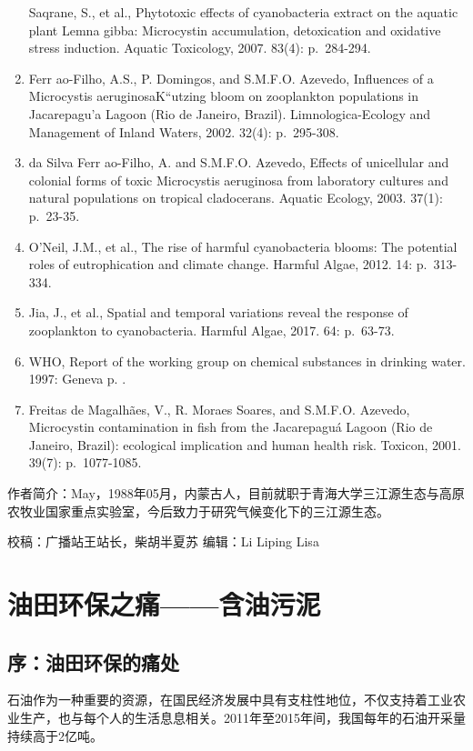 \documentclass[]{book}
\begin{document}
\begin{enumerate}
  Saqrane, S., et al., Phytotoxic effects of cyanobacteria extract on
  the aquatic plant Lemna gibba: Microcystin accumulation, detoxication
  and oxidative stress induction. Aquatic Toxicology, 2007. 83(4):
  p.~284-294.
\item
  Ferr ao-Filho, A.S., P. Domingos, and S.M.F.O. Azevedo, Influences of
  a Microcystis aeruginosaK``utzing bloom on zooplankton populations in
  Jacarepagu'a Lagoon (Rio de Janeiro, Brazil). Limnologica-Ecology and
  Management of Inland Waters, 2002. 32(4): p.~295-308.
\item
  da Silva Ferr ao-Filho, A. and S.M.F.O. Azevedo, Effects of
  unicellular and colonial forms of toxic Microcystis aeruginosa from
  laboratory cultures and natural populations on tropical cladocerans.
  Aquatic Ecology, 2003. 37(1): p.~23-35.
\item
  O'Neil, J.M., et al., The rise of harmful cyanobacteria blooms: The
  potential roles of eutrophication and climate change. Harmful Algae,
  2012. 14: p.~313-334.
\item
  Jia, J., et al., Spatial and temporal variations reveal the response
  of zooplankton to cyanobacteria. Harmful Algae, 2017. 64: p.~63-73.
\item
  WHO, Report of the working group on chemical substances in drinking
  water. 1997: Geneva p. .
\item
  Freitas de Magalhães, V., R. Moraes Soares, and S.M.F.O. Azevedo,
  Microcystin contamination in fish from the Jacarepaguá Lagoon (Rio de
  Janeiro, Brazil): ecological implication and human health risk.
  Toxicon, 2001. 39(7): p.~1077-1085.
\end{enumerate}

作者简介：May，1988年05月，内蒙古人，目前就职于青海大学三江源生态与高原农牧业国家重点实验室，今后致力于研究气候变化下的三江源生态。

校稿：广播站王站长，柴胡半夏苏 编辑：Li Liping Lisa

\section{油田环保之痛------含油污泥}

\subsection{序：油田环保的痛处}

石油作为一种重要的资源，在国民经济发展中具有支柱性地位，不仅支持着工业农业生产，也与每个人的生活息息相关。2011年至2015年间，我国每年的石油开采量持续高于2亿吨。
\end{document}
